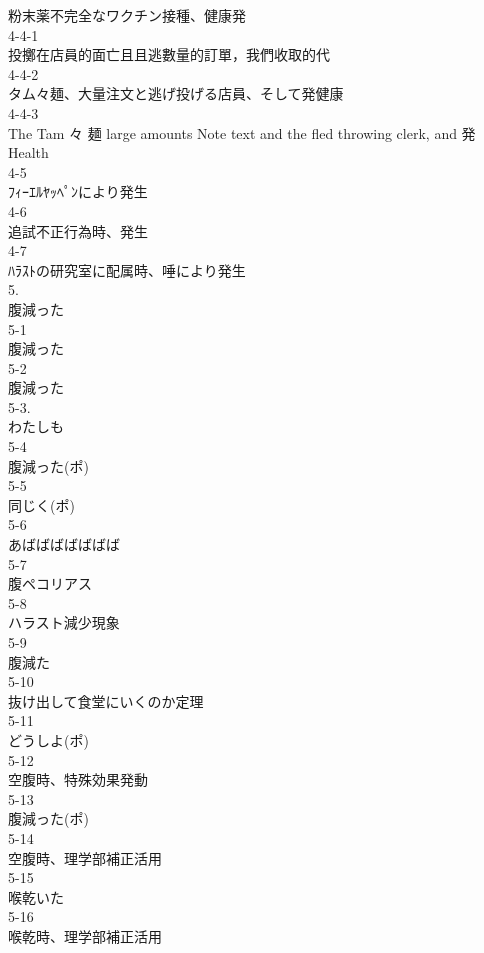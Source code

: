 粉末薬不完全なワクチン接種、健康発\\
4-4-1\\
投擲在店員的面亡且且逃數量的訂單，我們收取的代\\
4-4-2\\
タム々麺、大量注文と逃げ投げる店員、そして発健康\\
4-4-3\\
The Tam 々 麺 large amounts Note text and the fled throwing clerk, and 発 Health\\
4-5\\
ﾌｨｰｴﾙﾔｯﾍﾟﾝにより発生\\
4-6\\
追試不正行為時、発生\\
4-7\\
ﾊﾗｽﾄの研究室に配属時、唾により発生\\
5.\\
腹減った\\
5-1\\
腹減った\\
5-2\\
腹減った\\
5-3.\\
わたしも\\
5-4\\
腹減った(ポ)\\
5-5\\
同じく(ポ)\\
5-6\\
あばばばばばばば\\
5-7\\
腹ペコリアス\\
5-8\\
ハラスト減少現象\\
5-9\\
腹減た\\
5-10\\
抜け出して食堂にいくのか定理\\
5-11\\
どうしよ(ポ)\\
5-12\\
空腹時、特殊効果発動\\
5-13\\
腹減った(ポ)\\
5-14\\
空腹時、理学部補正活用\\
5-15\\
喉乾いた\\
5-16\\
喉乾時、理学部補正活用\\
